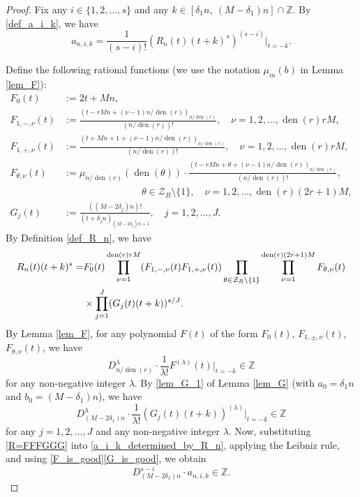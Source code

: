 \documentclass[12pt]{article}
\numberwithin{equation}{section}
\begin{document}
\begin{proof}
Fix any $i \in \{1,2,\ldots,s\}$ and any $k \in [\delta_1n,~(M-\delta_1)n] \cap \mathbb{Z}$. By \eqref{def_a_i_k}, we have
\begin{equation}\label{a_i_k_determined_by_R_n}
a_{n,i,k} = \frac{1}{(s-i)!} \left( R_n(t)(t+k)^{s} \right)^{(s-i)} \Big|_{t=-k}.
\end{equation}

Define the following rational functions (we use the notation $\mu_m(b)$ in Lemma \ref{lem_F}): 
\begin{align*}
F_0(t) &:= 2t+Mn, \\
F_{1,-,\nu}(t) &:= \frac{(t-rMn+ (\nu-1)n/\operatorname{den}(r))_{n/\operatorname{den}(r)}}{\left( n/\operatorname{den}(r) \right)!}, \quad \nu=1,2,\ldots,\operatorname{den}(r) rM, \\
F_{1,+,\nu}(t) &:= \frac{(t+Mn+1 + (\nu -1)n/\operatorname{den}(r))_{n/\operatorname{den}(r)}}{\left( n/\operatorname{den}(r) \right)!}, \quad \nu=1,2,\ldots,\operatorname{den}(r) rM, \\
F_{\theta,\nu}(t) &:= \mu_{n/\operatorname{den}(r)}(\operatorname{den}(\theta)) \cdot \frac{(t - rMn + \theta + (\nu-1)n/\operatorname{den}(r))_{n/\operatorname{den}(r)}}{\left(n/\operatorname{den}(r) \right)!}, \\ 
&\qquad\qquad\qquad\qquad \theta \in \mathcal{Z}_{B} \setminus \{1\}, \quad \nu = 1,2,\ldots, \operatorname{den}(r)(2r+1)M, \\
G_j(t) &:= \frac{((M-2\delta_j)n)!}{\left( t+\delta_j n \right)_{(M-2\delta_j)n+1}}, \quad j=1,2,\ldots,J.
\end{align*}
By Definition \ref{def_R_n}, we have
\begin{align}
	R_n(t)(t+k)^s = &F_0(t) \prod_{\nu=1}^{\operatorname{den}(r) rM} (F_{1,-,\nu}(t)F_{1,+,\nu}(t)) \prod_{\theta \in \mathcal{Z}_B \setminus \{1\} }\prod_{\nu=1}^{\operatorname{den}(r)(2r+1)M} F_{\theta,\nu}(t) \notag\\
	&\times \prod_{j=1}^{J} (G_j(t)(t+k))^{s/J}. \label{R=FFFGGG}
\end{align}
By Lemma \ref{lem_F}, for any polynomial $F(t)$ of the form $F_0(t)$, $F_{1,\pm,\nu}(t)$, $F_{\theta,\nu}(t)$, we have
\begin{equation}\label{F_is_good}
D_{n/\operatorname{den}(r)}^{\lambda} \cdot \frac{1}{\lambda!} F^{(\lambda)}(t) \big|_{t=-k} \in \mathbb{Z} 
\end{equation} 
for any non-negative integer $\lambda$.
By \eqref{lem_G_1} of Lemma \ref{lem_G} (with $a_0 = \delta_1n$ and $b_0 = (M-\delta_1)n$), we have
\begin{equation}\label{G_is_good}
D_{(M-2\delta_1)n}^{\lambda} \cdot \frac{1}{\lambda!} \left( G_j(t)(t+k) \right)^{(\lambda)} \big|_{t=-k} \in \mathbb{Z} 
\end{equation}
for any $j=1,2,\ldots,J$ and any non-negative integer $\lambda$. Now, substituting \eqref{R=FFFGGG} into \eqref{a_i_k_determined_by_R_n}, applying the Leibniz rule, and using \eqref{F_is_good}\eqref{G_is_good}, we obtain
\begin{equation}\label{arith_anik_1}
D_{(M-2\delta_1)n}^{s-i} \cdot  a_{n,i,k} \in \mathbb{Z}.
\end{equation} 


\end{proof}
\end{document}
